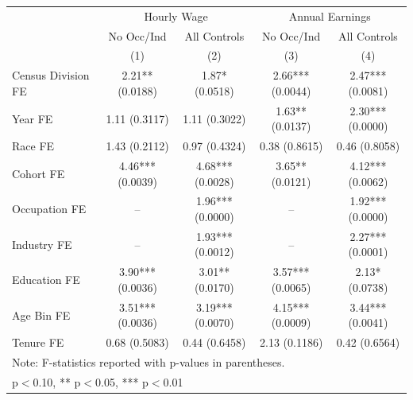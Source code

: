 \begin{tabular}{lcccc}
\hline\hline
 & \multicolumn{2}{c}{Hourly Wage} & \multicolumn{2}{c}{Annual Earnings} \\
 & No Occ/Ind & All Controls & No Occ/Ind & All Controls \\
 & (1) & (2) & (3) & (4) \\
\hline
Census Division FE&2.21** (0.0188)&1.87* (0.0518)&2.66*** (0.0044)&2.47*** (0.0081)\\
Year FE&1.11 (0.3117)&1.11 (0.3022)&1.63** (0.0137)&2.30*** (0.0000)\\
Race FE&1.43 (0.2112)&0.97 (0.4324)&0.38 (0.8615)&0.46 (0.8058)\\
Cohort FE&4.46*** (0.0039)&4.68*** (0.0028)&3.65** (0.0121)&4.12*** (0.0062)\\
Occupation FE&--&1.96*** (0.0000)&--&1.92*** (0.0000)\\
Industry FE&--&1.93*** (0.0012)&--&2.27*** (0.0001)\\
Education FE&3.90*** (0.0036)&3.01** (0.0170)&3.57*** (0.0065)&2.13* (0.0738)\\
Age Bin FE&3.51*** (0.0036)&3.19*** (0.0070)&4.15*** (0.0009)&3.44*** (0.0041)\\
Tenure FE&0.68 (0.5083)&0.44 (0.6458)&2.13 (0.1186)&0.42 (0.6564)\\
\hline
\multicolumn{5}{l}{\footnotesize Note: F-statistics reported with p-values in parentheses.} \\
\multicolumn{5}{l}{\footnotesize * p$<$0.10, ** p$<$0.05, *** p$<$0.01} \\
\hline\hline
\end{tabular}
